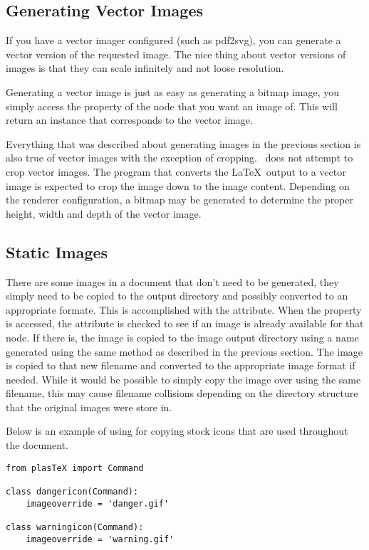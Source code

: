 \subsection{Generating Vector Images}

If you have a vector imager configured (such as pdf2svg), you
can generate a vector version of the requested image. The nice thing about
vector versions of images is that they can scale infinitely and not loose
resolution.

Generating a vector image is just as easy as generating a bitmap image,
you simply access the  property of the node that
you want an image of.  This will return an 
instance that corresponds to the vector image.

Everything that was described about generating images in the previous
section is also true of vector images with the exception of cropping.
\plasTeX\ does not attempt to crop vector images.  The program that
converts the \LaTeX\ output to a vector image is expected to crop the
image down to the image content.  Depending on the renderer configuration, a
bitmap may be generated to determine the proper height, width and depth of
the vector image.


\subsection{Static Images}

There are some images in a document that don't need to be generated, they
simply need to be copied to the output directory and possibly converted
to an appropriate formate.  This is accomplished with the
 attribute.  When the  property
is accessed, the  attribute is checked to see if
an image is already available for that node.  If there is, the image
is copied to the image output directory using a name generated
using the same method as described in the previous section.  The image
is copied to that new filename and converted to the appropriate
image format if needed.  While it would be possible to simply copy the
image over using the same filename, this may cause filename collisions
depending on the directory structure that the original images were
store in.

Below is an example of using  for copying
stock icons that are used throughout the document.
\begin{verbatim}
from plasTeX import Command

class dangericon(Command):
    imageoverride = 'danger.gif'

class warningicon(Command):
    imageoverride = 'warning.gif'
\end{verbatim}

